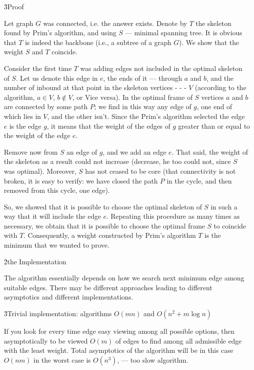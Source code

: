 \h3{Proof}

Let graph $G$ was connected, i.e. the answer exists. Denote by $T$ the skeleton found by Prim's algorithm, and using $S$ --- minimal spanning tree. It is obvious that $T$ is indeed the backbone (i.e., a subtree of a graph $G$). We show that the weight $S$ and $T$ coincide.

Consider the first time $T$ was adding edges not included in the optimal skeleton of $S$. Let us denote this edge in $e$, the ends of it --- through $a$ and $b$, and the number of inbound at that point in the skeleton vertices - - - $V$ (according to the algorithm, $a \in V$, $b \not\in V$, or Vice versa). In the optimal frame of $S$ vertices $a$ and $b$ are connected by some path $P$; we find in this way any edge of $g$, one end of which lies in $V$, and the other isn't. Since the Prim's algorithm selected the edge $e$ is the edge $g$, it means that the weight of the edges of $g$ greater than or equal to the weight of the edge $e$.

Remove now from $S$ an edge of $g$, and we add an edge $e$. That said, the weight of the skeleton as a result could not increase (decrease, he too could not, since $S$ was optimal). Moreover, $S$ has not ceased to be core (that connectivity is not broken, it is easy to verify: we have closed the path $P$ in the cycle, and then removed from this cycle, one edge).

So, we showed that it is possible to choose the optimal skeleton of $S$ in such a way that it will include the edge $e$. Repeating this procedure as many times as necessary, we obtain that it is possible to choose the optimal frame $S$ to coincide with $T$. Consequently, a weight constructed by Prim's algorithm $T$ is the minimum that we wanted to prove.


\h2{the Implementation}

The algorithm essentially depends on how we search next minimum edge among suitable edges. There may be different approaches leading to different asymptotics and different implementations.


\h3{Trivial implementation: algorithms $O(m n)$ and $O(n^2 + m \log n)$}

If you look for every time edge easy viewing among all possible options, then asymptotically to be viewed $O(m)$ of edges to find among all admissible edge with the least weight. Total asymptotics of the algorithm will be in this case $O(nm)$ in the worst case is $O(n^3)$, --- too slow algorithm.

